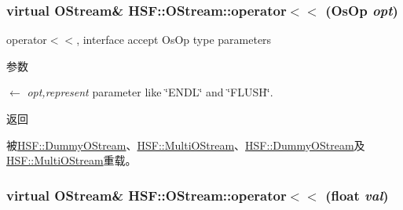 \label{classHSF_1_1OStream_a28f9c27531a8839602aafa81dccbb543}
\hypertarget{classHSF_1_1OStream_aa7a6f8ac15aaa2145e23f92904350b39}{
\subsubsection[{operator$<$$<$}]{\setlength{\rightskip}{0pt plus 5cm}virtual {\bf OStream}\& HSF::OStream::operator$<$$<$ ({\bf OsOp} {\em opt})}}
\label{classHSF_1_1OStream_aa7a6f8ac15aaa2145e23f92904350b39}


operator$<$$<$, interface accept OsOp type parameters 
\begin{DoxyParams}{参数}
\item[\mbox{$\leftarrow$} {\em opt,represent}]parameter like \char`\"{}ENDL\char`\"{} and \char`\"{}FLUSH\char`\"{}. \end{DoxyParams}
\begin{DoxyReturn}{返回}

\end{DoxyReturn}


被\hyperlink{classHSF_1_1DummyOStream_a7b609938f7a2d4304a463d6164c2ec3b}{HSF::DummyOStream}、\hyperlink{classHSF_1_1MultiOStream_a31d1b48c4c7aac4ec51352f4dad28c8a}{HSF::MultiOStream}、\hyperlink{classHSF_1_1DummyOStream_a7b609938f7a2d4304a463d6164c2ec3b}{HSF::DummyOStream}及\hyperlink{classHSF_1_1MultiOStream_a31d1b48c4c7aac4ec51352f4dad28c8a}{HSF::MultiOStream}重载。\hypertarget{classHSF_1_1OStream_a26a658cc9ab9422d58252ef75a7ca360}{
\subsubsection[{operator$<$$<$}]{\setlength{\rightskip}{0pt plus 5cm}virtual {\bf OStream}\& HSF::OStream::operator$<$$<$ (float {\em val})}}
\label{classHSF_1_1OStream_a26a658cc9ab9422d58252ef75a7ca360}


